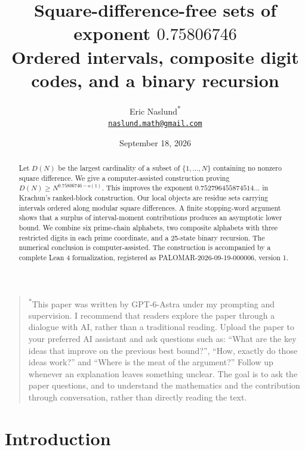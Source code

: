 \documentclass[11pt]{article}
\title{Square-difference-free sets of exponent \texorpdfstring{$0.75806746$}{0.75806746}\\[3pt]\large Ordered intervals, composite digit codes, and a binary recursion}
\author{Eric Naslund\textsuperscript{*}\\[3pt]
\normalsize\href{mailto:naslund.math@gmail.com}{\texttt{naslund.math@gmail.com}}}
\date{September 18, 2026}
\theoremstyle{definition}
\theoremstyle{remark}
\begin{document}
\maketitle
\begin{quote}
\small\noindent\textsuperscript{*}This paper was written by GPT-6-Astra under my prompting and supervision.
I recommend that readers explore the paper through a dialogue with AI, rather than a traditional reading.
Upload the paper to your preferred AI assistant and ask questions such as: ``What are the key ideas that improve on the previous best bound?'', ``How, exactly do those ideas work?'' and ``Where is the meat of the argument?''
Follow up whenever an explanation leaves something unclear.
The goal is to ask the paper questions, and to understand the mathematics and the contribution through conversation, rather than directly reading the text.
\end{quote}
\begin{abstract}
Let $D(N)$ be the largest cardinality of a subset of $\{1,\ldots,N\}$
containing no nonzero square difference. We give a computer-assisted construction
proving $D(N)\ge N^{0.75806746-o(1)}$. This improves the exponent
$0.752796455874514\ldots$ in Krachun's ranked-block construction.
Our local objects are residue sets carrying intervals ordered along modular
square differences. A finite stopping-word argument shows that a surplus of
interval-moment contributions produces an asymptotic lower bound.
We combine six prime-chain alphabets, two composite alphabets with three
restricted digits in each prime coordinate, and a 25-state binary recursion.
The numerical conclusion is computer-assisted. The construction is accompanied
by a complete Lean 4 formalization, registered as PALOMAR-2026-09-19-000006,
version 1.
\end{abstract}
\clearpage
\setcounter{tocdepth}{1}
\tableofcontents
\clearpage

\section{Introduction}
\end{document}
